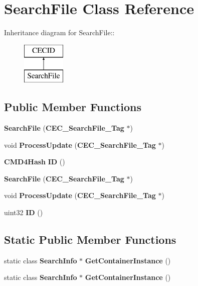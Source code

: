 \section{SearchFile Class Reference}
\label{classSearchFile}
Inheritance diagram for SearchFile::\begin{figure}[H]
\begin{center}
\leavevmode
\includegraphics[height=2cm]{classSearchFile}
\end{center}
\end{figure}
\subsection*{Public Member Functions}
\begin{DoxyCompactItemize}
\item 
{\bfseries SearchFile} ({\bf CEC\_\-SearchFile\_\-Tag} $\ast$)\label{classSearchFile_a13985a5a81a10c0eae826c81be8104e9}

\item 
void {\bfseries ProcessUpdate} ({\bf CEC\_\-SearchFile\_\-Tag} $\ast$)\label{classSearchFile_a152cd439561099644fabeb54caad2132}

\item 
{\bf CMD4Hash} {\bfseries ID} ()\label{classSearchFile_ad7af1f40cc2c90fbf8ffcfb18f9ad718}

\item 
{\bfseries SearchFile} ({\bf CEC\_\-SearchFile\_\-Tag} $\ast$)\label{classSearchFile_a13985a5a81a10c0eae826c81be8104e9}

\item 
void {\bfseries ProcessUpdate} ({\bf CEC\_\-SearchFile\_\-Tag} $\ast$)\label{classSearchFile_a152cd439561099644fabeb54caad2132}

\item 
uint32 {\bfseries ID} ()\label{classSearchFile_a4fb3b166d4f06506b72bf8d98251d543}

\end{DoxyCompactItemize}
\subsection*{Static Public Member Functions}
\begin{DoxyCompactItemize}
\item 
static class {\bf SearchInfo} $\ast$ {\bfseries GetContainerInstance} ()\label{classSearchFile_a50790c2a411b3b7d30073d67dbc35919}

\item 
static class {\bf SearchInfo} $\ast$ {\bfseries GetContainerInstance} ()\label{classSearchFile_abad67a7ba222601d7734e25d80d13d84}

\end{DoxyCompactItemize}
